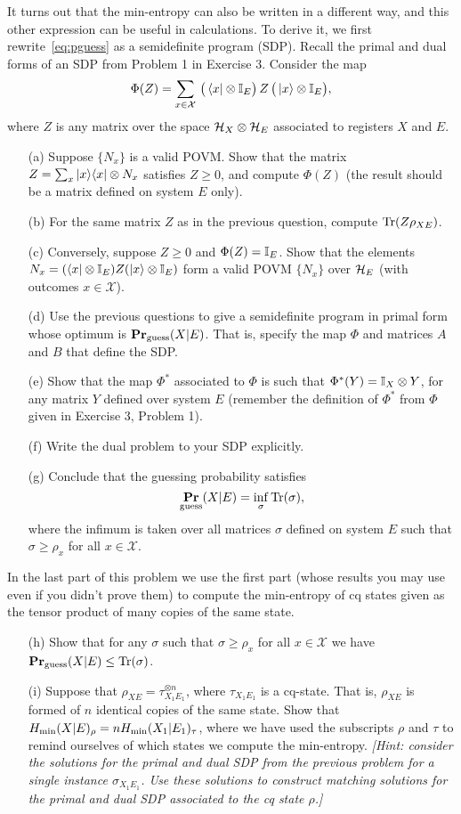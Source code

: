 \documentclass[12pt]{article}
\begin{document}
\begin{enumerate}
It turns out that the min-entropy can also be written in a different way, and this other expression can be useful in calculations. To derive it, we first rewrite~\eqref{eq:pguess} as a semidefinite program (SDP). Recall the primal and dual forms of an SDP from Problem 1 in Exercise 3.  Consider the map 
$$\Phi(Z) = \sum_{x\in\mathcal{X}} \,\big(\bra{x} \otimes \Id_E\big) \,Z\, \big(\ket{x}\otimes\Id_E\big),$$
where $Z$ is any matrix over the space $\mH_X\otimes \mH_E$ associated to registers $X$ and $E$. 
\begin{enumerate}
\item[(a)] Suppose $\{N_x\}$ is a valid POVM. Show that the matrix $Z = \sum_x \proj{x}\otimes N_x$ satisfies $Z\geq 0 $, and compute $\Phi(Z)$ (the result should be a matrix defined on system $E$ only).
\item[(b)] For the same matrix $Z$ as in the previous question, compute $\Tr(Z\rho_{XE})$. 
\item[(c)] Conversely, suppose $Z \geq 0$ and $\Phi(Z) = \Id_E$. Show that the elements $N_x = (\bra{x} \otimes \Id_E) Z (\ket{x}\otimes\Id_E)$ form a valid POVM $\{N_x\}$ over $\mH_E$ (with outcomes $x\in \mathcal{X}$).  
\item[(d)] Use the previous questions to give a semidefinite program in primal form whose optimum is $\Pr_{\rm guess}(X|E)$. That is, specify the map $\Phi$ and matrices $A$ and $B$ that define the SDP.  
\item[(e)] Show that the map $\Phi^*$ associated to $\Phi$ is such that $\Phi^*(Y) = \Id_X \otimes Y$, for any matrix $Y$ defined over system $E$ (remember the definition of $\Phi^*$ from $\Phi$ given in Exercise 3, Problem 1).
\item[(f)] Write the dual problem to your SDP explicitly. 
\item[(g)] Conclude that the guessing probability satisfies
$$ \Pr_{\rm guess}(X|E) = \inf_\sigma \Tr(\sigma),$$
 where the infimum is taken over all matrices $\sigma$ defined on system $E$ such that $\sigma \geq \rho_x$ for all $x\in\mathcal{X}$. 
\end{enumerate}
In the last part of this problem we use the first part (whose results you may use even if you didn't prove them) to compute the min-entropy of cq states given as the tensor product of many copies of the same state. 
\begin{enumerate}
\item[(h)] Show that for any $\sigma$ such that $\sigma \geq \rho_x$ for all $x \in \mathcal{X}$ we have $\Pr_{\rm guess}(X|E)\leq \Tr(\sigma)$.
\item[(i)] Suppose that $\rho_{XE} = \tau_{X_1E_1}^{\otimes n}$, where $\tau_{X_1E_1}$ is a cq-state. That is, $\rho_{XE}$ is formed of $n$ identical copies of the same state. Show that $\hmin(X|E)_\rho = n \hmin(X_1|E_1)_\tau$, where we have used the subscripts $\rho$ and $\tau$ to remind ourselves
of which states we compute the min-entropy. \emph{[Hint: consider the solutions for the primal and dual SDP from the previous problem for a single instance $\sigma_{X_1E_1}$. Use these solutions to construct matching solutions for the primal and dual SDP associated to the cq state $\rho$.]}
\end{enumerate}

\end{enumerate}
\end{document}
